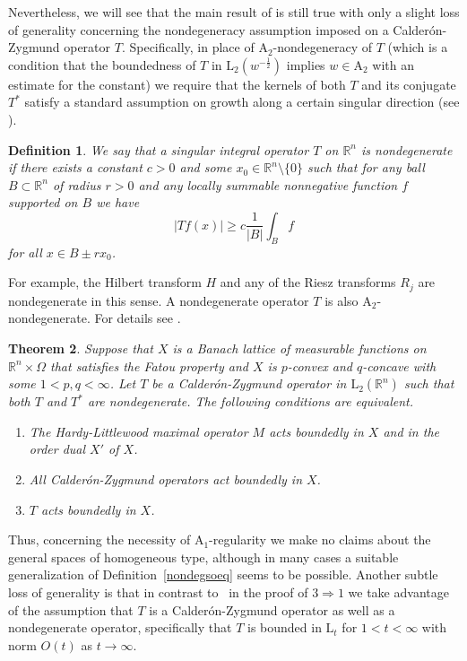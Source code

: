 \documentclass[12pt]{amsart}
\newtheorem {theorem} {Theorem}
\newtheorem {definition} [theorem] {Definition}
\newcommand {\apclass} [1] {\ensuremath{\mathrm A_{#1}}}
\newcommand {\lclass} [2] {\ensuremath{\mathrm L_{#1} \left( #2 \right) }}
\newcommand {\lclassg} [1] {\ensuremath{\mathrm L_{#1}}}
\newcommand {\weightw} {\ensuremath {\mathit w}}
\begin{document}
Nevertheless, we will see that the main result of \cite {rutsky2014sm} is still true with only a slight
loss of generality concerning the nondegeneracy assumption imposed on a Calder\'on-Zygmund operator $T$.
Specifically, in place of $\apclass {2}$-nondegeneracy of $T$ (which is a condition that
the boundedness of $T$ in $\lclass {2} {\weightw^{-\frac 1 2}}$ implies $\weightw \in \apclass {2}$ with
an estimate for the constant)
we require that the kernels of both $T$ and its conjugate $T^*$
satisfy a standard assumption on growth along a certain singular direction
(see \cite [Chapter~5, \S 4.6] {stein1993}).
\begin {definition}
\label {nondegop}
We say that a singular integral operator $T$ on $\mathbb R^n$ is nondegenerate if
there exists a constant $c > 0$ and some $x_0 \in \mathbb R^n \setminus \{0\}$
such that for any ball $B \subset \mathbb R^n$ of radius $r > 0$ and any locally summable
nonnegative function $f$ supported on $B$
we have
\begin {equation}
\label {nondegsoeq}
|T f (x)| \geqslant c \frac 1 {|B|} \int_B f
\end {equation}
for all $x \in B \pm r x_0$.
\end {definition}
For example, the Hilbert transform $H$ and any of the Riesz transforms $R_j$ are 
nondegenerate in this sense.
A nondegenerate operator $T$ is also $\apclass {2}$-nondegenerate.  For details see \cite [Chapter~5, \S 4.6] {stein1993}.

\begin {theorem}
\label {themcr}
Suppose that $X$ is a Banach lattice of measurable functions on $\mathbb R^n \times \Omega$ that satisfies the Fatou property
and $X$ is $p$-convex and $q$-concave with some $1 < p, q < \infty$.
Let $T$ be a Calder\'on-Zygmund operator in $\lclass {2} {\mathbb R^n}$ such that
both $T$ and $T^*$ are nondegenerate.
The following conditions are equivalent.
\begin {enumerate}
\item
The Hardy-Littlewood maximal operator $M$ acts boundedly in $X$ and in the order dual $X'$ of $X$.
\item
All Calder\'on-Zygmund operators act boundedly in $X$.
\item
$T$ acts boundedly in $X$.
\end {enumerate}
\end {theorem}

Thus, concerning the necessity of $\apclass {1}$-regularity
we make no claims about the general spaces of homogeneous type, although in many cases a suitable generalization
of Definition~\ref {nondegsoeq} seems to be possible.
Another subtle loss of generality is that in contrast to~\cite [Theorem~16] {stein1993}
in the proof of $3 \Rightarrow 1$ we take advantage
of the assumption that $T$ is a Calder\'on-Zygmund operator as well as a nondegenerate operator, specifically that
$T$ is bounded in $\lclassg {t}$ for $1 < t < \infty$
with norm $O (t)$ as $t \to \infty$.
\end{document}
